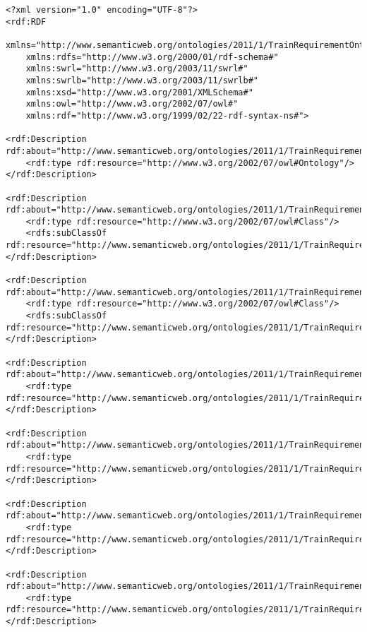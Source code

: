 \lstset{language=XML,breaklines=true}
\begin{lstlisting}[caption=A graph based on the railway system metamodel stored in RDF format]
<?xml version="1.0" encoding="UTF-8"?>
<rdf:RDF
	xmlns="http://www.semanticweb.org/ontologies/2011/1/TrainRequirementOntology.owl#"
	xmlns:rdfs="http://www.w3.org/2000/01/rdf-schema#"
	xmlns:swrl="http://www.w3.org/2003/11/swrl#"
	xmlns:swrlb="http://www.w3.org/2003/11/swrlb#"
	xmlns:xsd="http://www.w3.org/2001/XMLSchema#"
	xmlns:owl="http://www.w3.org/2002/07/owl#"
	xmlns:rdf="http://www.w3.org/1999/02/22-rdf-syntax-ns#">

<rdf:Description rdf:about="http://www.semanticweb.org/ontologies/2011/1/TrainRequirementOntology.owl">
	<rdf:type rdf:resource="http://www.w3.org/2002/07/owl#Ontology"/>
</rdf:Description>

<rdf:Description rdf:about="http://www.semanticweb.org/ontologies/2011/1/TrainRequirementOntology.owl#Segment">
	<rdf:type rdf:resource="http://www.w3.org/2002/07/owl#Class"/>
	<rdfs:subClassOf rdf:resource="http://www.semanticweb.org/ontologies/2011/1/TrainRequirementOntology.owl#Trackelement"/>
</rdf:Description>

<rdf:Description rdf:about="http://www.semanticweb.org/ontologies/2011/1/TrainRequirementOntology.owl#Switch">
	<rdf:type rdf:resource="http://www.w3.org/2002/07/owl#Class"/>
	<rdfs:subClassOf rdf:resource="http://www.semanticweb.org/ontologies/2011/1/TrainRequirementOntology.owl#Trackelement"/>
</rdf:Description>

<rdf:Description rdf:about="http://www.semanticweb.org/ontologies/2011/1/TrainRequirementOntology.owl#1">
	<rdf:type rdf:resource="http://www.semanticweb.org/ontologies/2011/1/TrainRequirementOntology.owl#Sensor"/>
</rdf:Description>

<rdf:Description rdf:about="http://www.semanticweb.org/ontologies/2011/1/TrainRequirementOntology.owl#2">
	<rdf:type rdf:resource="http://www.semanticweb.org/ontologies/2011/1/TrainRequirementOntology.owl#Route"/>
</rdf:Description>

<rdf:Description rdf:about="http://www.semanticweb.org/ontologies/2011/1/TrainRequirementOntology.owl#3">
	<rdf:type rdf:resource="http://www.semanticweb.org/ontologies/2011/1/TrainRequirementOntology.owl#Switch"/>
</rdf:Description>

<rdf:Description rdf:about="http://www.semanticweb.org/ontologies/2011/1/TrainRequirementOntology.owl#4">
	<rdf:type rdf:resource="http://www.semanticweb.org/ontologies/2011/1/TrainRequirementOntology.owl#SwitchPosition"/>
</rdf:Description>


\end{lstlisting}
